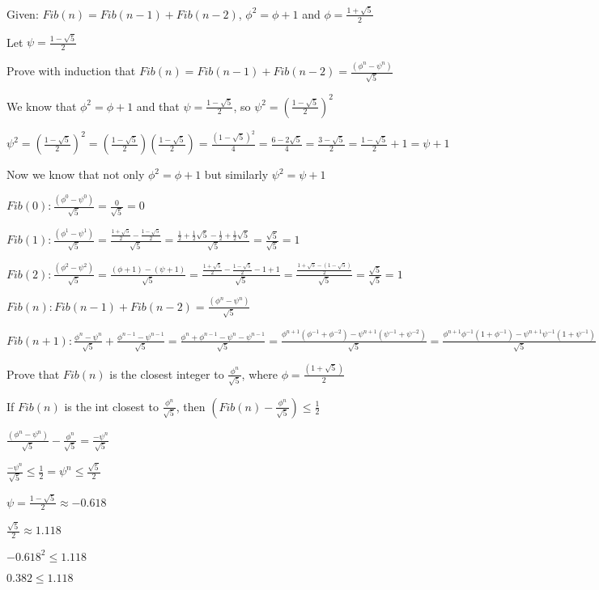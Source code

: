 \documentclass{12pt}{article}
\begin{document}
Given: $ Fib(n) = Fib(n - 1) + Fib(n - 2)$,  $\phi^2 = \phi + 1$ and $\phi = \frac{1 + \sqrt{5}}{2}$

Let $ \psi = \frac{1-\sqrt{5}}{2} $

Prove with induction that $ Fib(n) = Fib(n - 1) + Fib(n - 2) = \frac{(\phi^n-\psi^n)}{\sqrt{5}} $

We know that $ \phi^2 = \phi + 1$ and that $\psi = \frac{1-\sqrt{5}}{2}$, so $\psi^2 = (\frac{1-\sqrt{5}}{2})^2 $

$ \psi^2 = (\frac{1-\sqrt{5}}{2})^2 = (\frac{1-\sqrt{5}}{2})(\frac{1-\sqrt{5}}{2}) = \frac{(1-\sqrt{5})^2}{4} = \frac{6-2\sqrt5}{4} = \frac{3-\sqrt{5}}{2} = \frac{1-\sqrt{5}}{2} + 1 = \psi + 1 $

Now we know that not only $\phi^2 = \phi + 1$ but similarly $\psi^2 = \psi + 1$

$ Fib(0): \frac{(\phi^0-\psi^0)}{\sqrt{5}} = \frac{0}{\sqrt{5}} = 0 $

$ Fib(1): \frac{(\phi^1-\psi^1)}{\sqrt{5}} = \frac{\frac{1 + \sqrt{5}}{2} - \frac{1 - \sqrt{5}}{2}}{\sqrt{5}} = \frac{\frac{1}{2} + \frac{1}{2}\sqrt{5} - \frac{1}{2} + \frac{1}{2}\sqrt{5}}{\sqrt{5}} = \frac{\sqrt{5}}{\sqrt{5}} = 1 $

$ Fib(2): \frac{(\phi^2-\psi^2)}{\sqrt{5}} = \frac{(\phi + 1) - (\psi + 1)}{\sqrt{5}} = \frac{\frac{1 + \sqrt{5}}{2} - \frac{1 - \sqrt{5}}{2} - 1 + 1}{\sqrt{5}} = \frac{\frac{1 + \sqrt{5} - (1 - \sqrt{5})}{2}}{\sqrt{5}} = \frac{\sqrt{5}}{\sqrt{5}} = 1 $

$ Fib(n): Fib(n - 1) + Fib(n - 2) = \frac{(\phi^n-\psi^n)}{\sqrt{5}} $

$ Fib(n+1): \frac{\phi^n - \psi^n}{\sqrt{5}} + \frac{\phi^{n - 1} - \psi^{n - 1}}{\sqrt{5}} = \frac{\phi^n + \phi^{n - 1} - \psi^n - \psi^{n - 1}}{\sqrt{5}} = \frac{\phi^{n + 1}(\phi^{-1} + \phi^{-2}) - \psi^{n + 1}(\psi^{-1} + \psi^{-2})}{\sqrt{5}} = \frac{\phi^{n + 1}\phi^{-1}(1 + \phi^{-1}) - \psi^{n + 1}\psi^{-1}(1 + \psi^{-1})}{\sqrt{5}} = \frac{\phi^{n + 1}\phi^{-1}\phi - \psi^{n + 1}\psi^{-1}\psi}{\sqrt{5}} = \frac{\phi^{n + 1} - \psi^{n + 1}}{\sqrt{5}} $

Prove that $ Fib(n) $ is the closest integer to $ \frac{\phi^n}{\sqrt{5}} $, where $ \phi = \frac{(1 + \sqrt{5})}{2} $

If $ Fib(n) $ is the int closest to $ \frac{\phi^n}{\sqrt{5}} $, then $ (Fib(n) - \frac{\phi^n}{\sqrt{5}}) \leq \frac{1}{2} $

$ \frac{(\phi^n-\psi^n)}{\sqrt{5}} - \frac{\phi^n}{\sqrt{5}} = \frac{-\psi^n}{\sqrt{5}} $

$ \frac{-\psi^n}{\sqrt{5}} \leq \frac{1}{2} = \psi^n \leq \frac{\sqrt{5}}{2} $

$ \psi = \frac{1-\sqrt{5}}{2} \approx -0.618 $

$ \frac{\sqrt{5}}{2} \approx 1.118 $

$ -0.618^2 \leq 1.118 $

$ 0.382 \leq 1.118 $
\end{document}
